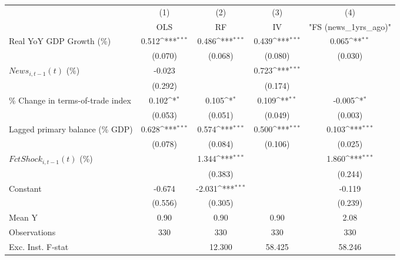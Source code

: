 {
\def\sym#1{\ifmmode^{#1}\else\(^{#1}\)\fi}
\begin{tabular}{l*{4}{c}}
\toprule
                    &\multicolumn{1}{c}{(1)}&\multicolumn{1}{c}{(2)}&\multicolumn{1}{c}{(3)}&\multicolumn{1}{c}{(4)}\\
                    &\multicolumn{1}{c}{OLS}&\multicolumn{1}{c}{RF}&\multicolumn{1}{c}{IV}&\multicolumn{1}{c}{ "FS (news_1yrs_ago)" }\\
\midrule
Real YoY GDP Growth (\%)&       0.512\sym{***}&       0.486\sym{***}&       0.439\sym{***}&       0.065\sym{**} \\
                    &     (0.070)         &     (0.068)         &     (0.080)         &     (0.030)         \\
\addlinespace
$ News_{i,t-1}(t)$ (\%)&      -0.023         &                     &       0.723\sym{***}&                     \\
                    &     (0.292)         &                     &     (0.174)         &                     \\
\addlinespace
\% Change in terms-of-trade index&       0.102\sym{*}  &       0.105\sym{*}  &       0.109\sym{**} &      -0.005\sym{*}  \\
                    &     (0.053)         &     (0.051)         &     (0.049)         &     (0.003)         \\
\addlinespace
Lagged primary balance (\% GDP)&       0.628\sym{***}&       0.574\sym{***}&       0.500\sym{***}&       0.103\sym{***}\\
                    &     (0.078)         &     (0.084)         &     (0.106)         &     (0.025)         \\
\addlinespace
$ FctShock_{i,t-1}(t)$ (\%)&                     &       1.344\sym{***}&                     &       1.860\sym{***}\\
                    &                     &     (0.383)         &                     &     (0.244)         \\
\addlinespace
Constant            &      -0.674         &      -2.031\sym{***}&                     &      -0.119         \\
                    &     (0.556)         &     (0.305)         &                     &     (0.239)         \\
\midrule
Mean Y              &        0.90         &        0.90         &        0.90         &        2.08         \\
Observations        &         330         &         330         &         330         &         330         \\
Exc. Inst. F-stat   &                     &      12.300         &      58.425         &      58.246         \\
\bottomrule
\end{tabular}
}
